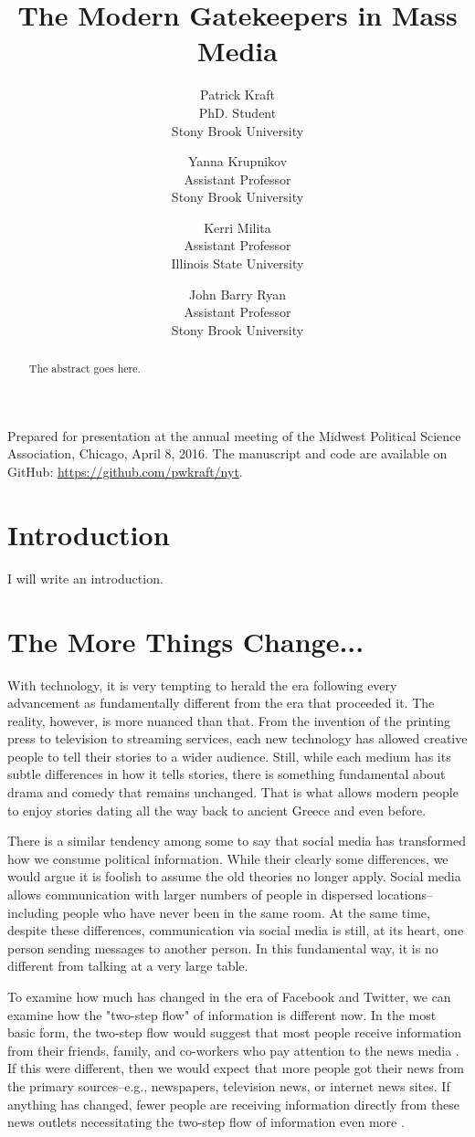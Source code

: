 \documentclass[12pt]{article}
\title{The Modern Gatekeepers in Mass Media}
\author{Patrick Kraft\\PhD. Student\\Stony Brook University \and Yanna Krupnikov\\Assistant Professor\\Stony Brook University \and Kerri Milita\\Assistant Professor\\Illinois State University \and John Barry Ryan\\Assistant Professor\\Stony Brook University}
\begin{document}
\maketitle\thispagestyle{empty}

\begin{abstract}
The abstract goes here.
\end{abstract}

\bigskip
Prepared for presentation at the annual meeting of the Midwest Political Science Association, Chicago, April 8, 2016. The manuscript and code are available on GitHub: \url{https://github.com/pwkraft/nyt}.

\newpage
\clearpage
\setcounter{page}{1}
\begin{doublespace}
\section{Introduction}
I will write an introduction.

\section{The More Things Change...}

With technology, it is very tempting to herald the era following every advancement as fundamentally different from the era that proceeded it. The reality, however, is more nuanced than that. From the invention of the printing press to television to streaming services, each new technology has allowed creative people to tell their stories to a wider audience. Still, while each medium has its subtle differences in how it tells stories, there is something fundamental about drama and comedy that remains unchanged. That is what allows modern people to enjoy stories dating all the way back to ancient Greece and even before.

There is a similar tendency among some to say that social media has transformed how we consume political information. While their clearly some differences, we would argue it is foolish to assume the old theories no longer apply. Social media allows communication with larger numbers of people in dispersed locations--including people who have never been in the same room. At the same time, despite these differences, communication via social media is still, at its heart, one person sending messages to another person. In this fundamental way, it is no different from talking at a very large table.

To examine how much has changed in the era of Facebook and Twitter, we can examine how the "two-step flow" of information is different now. In the most basic form, the two-step flow would suggest that most people receive information from their friends, family, and co-workers who pay attention to the news media \citep{Katz1957}. If this were different, then we would expect that more people got their news from the primary sources--e.g., newspapers, television news, or internet news sites. If anything has changed, fewer people are receiving information directly from these news outlets necessitating the two-step flow of information even more \citep{Prior2005}.


\end{doublespace}
\end{document}
